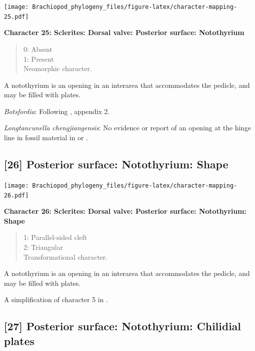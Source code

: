 \documentclass[openany]{book}
\theoremstyle{definition}
\theoremstyle{definition}
\theoremstyle{definition}
\theoremstyle{remark}
\begin{document}
\texttt{[image: Brachiopod\_phylogeny\_files/figure-latex/character-mapping-25.pdf]}

\textbf{Character 25: Sclerites: Dorsal valve: Posterior surface:
Notothyrium}

\begin{quote}
0: Absent\\
1: Present\\
Neomorphic character.
\end{quote}

A notothyrium is an opening in an interarea that accommodates the
pedicle, and may be filled with plates.

\hypertarget{Botsfordia-coding-25}{}
\emph{Botsfordia}: Following \citet{Williams1998Thediversity}, appendix
2.

\hypertarget{Longtancunella_chengjiangensis-coding-25}{}
\emph{Longtancunella chengjiangensis}: No evidence or report of an
opening at the hinge line in fossil material in
\citet{Zhang2007Agregarious} or \citet{Zhang2011Theexceptionally}.

\subsection*{{[}26{]} Posterior surface: Notothyrium:
Shape}\label{posterior-surface-notothyrium-shape}

\texttt{[image: Brachiopod\_phylogeny\_files/figure-latex/character-mapping-26.pdf]}

\textbf{Character 26: Sclerites: Dorsal valve: Posterior surface:
Notothyrium: Shape}

\begin{quote}
1: Parallel-sided cleft\\
2: Triangular\\
Transformational character.
\end{quote}

A notothyrium is an opening in an interarea that accommodates the
pedicle, and may be filled with plates.

A simplification of character 5 in
\citet{Bassett2001Functionalmorphology}.

\subsection*{{[}27{]} Posterior surface: Notothyrium: Chilidial
plates}\label{posterior-surface-notothyrium-chilidial-plates}
\end{document}
